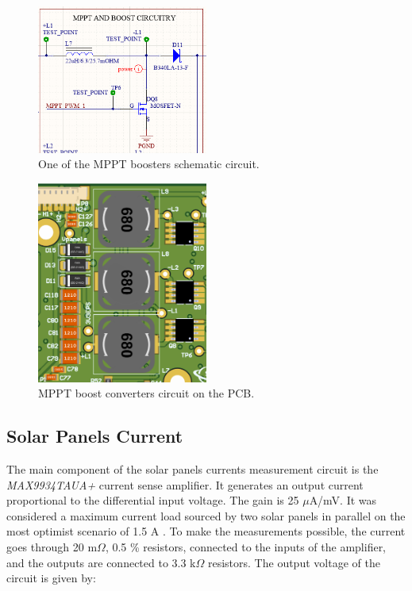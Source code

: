 \begin{figure}[!ht]
    \begin{center}
        \includegraphics[width=0.5\textwidth]{figures/mppt-boosters-circuit-schematic.png}
        \caption{One of the MPPT boosters schematic circuit.}
        \label{fig:mppt-boosters-circuit-schematic}
    \end{center}
\end{figure}

\begin{figure}[!ht]
    \begin{center}
        \includegraphics[width=0.5\textwidth]{figures/mppt-boosters-circuit-3d.png}
        \caption{MPPT boost converters circuit on the PCB.}
        \label{fig:mppt-boosters-circuit-3d}
    \end{center}
\end{figure}

\subsection{Solar Panels Current}

The main component of the solar panels currents measurement circuit is the \textit{MAX9934TAUA+} current sense amplifier. It generates an output current proportional to the differential input voltage. The gain is 25 $\mu$A/mV. It was considered a maximum current load sourced by two solar panels in parallel on the most optimist scenario of 1.5 A . To make the measurements possible, the current goes through 20 m$\Omega$, 0.5 \% resistors, connected to the inputs of the amplifier, and the outputs are connected to 3.3 k$\Omega$ resistors. The output voltage of the circuit is given by:

